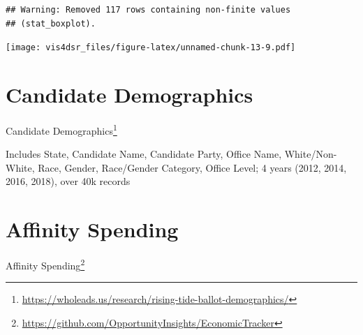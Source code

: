\documentclass[
]{krantz}
\renewcommand{\href}[2]{#2\footnote{\url{#1}}}
\begin{document}
\begin{verbatim}
## Warning: Removed 117 rows containing non-finite values
## (stat_boxplot).
\end{verbatim}

\texttt{[image: vis4dsr\_files/figure-latex/unnamed-chunk-13-9.pdf]}

\hypertarget{candidate-demographics}{%
\section*{Candidate Demographics}\label{candidate-demographics}}


\href{https://wholeads.us/research/rising-tide-ballot-demographics/}{Candidate Demographics}

Includes State, Candidate Name, Candidate Party, Office Name, White/Non-White, Race, Gender, Race/Gender Category, Office Level; 4 years (2012, 2014, 2016, 2018), over 40k records

\hypertarget{affinity-spending}{%
\section*{Affinity Spending}\label{affinity-spending}}


\href{https://github.com/OpportunityInsights/EconomicTracker}{Affinity Spending}

  

\backmatter
\printindex
\end{document}
